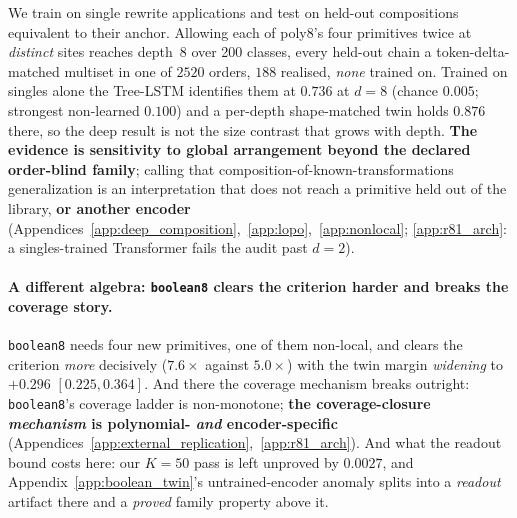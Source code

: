We train on single rewrite applications and test on held-out compositions equivalent to their anchor. Allowing each of poly8's four primitives twice at \emph{distinct} sites reaches depth~8 over 200 classes, every held-out chain a token-delta-matched multiset in one of $2520$ orders, $188$ realised, \emph{none} trained on. Trained on singles alone the Tree-LSTM identifies them at $\mathbf{0.736}$ at $d{=}8$ (chance $0.005$; strongest non-learned $0.100$) and a per-depth shape-matched twin holds $\mathbf{0.876}$ there, so the deep result is not the size contrast that grows with depth. \textbf{The evidence is sensitivity to global arrangement beyond the declared order-blind family}; calling that composition-of-known-transformations generalization is an interpretation that does not reach a primitive held out of the library, \textbf{or another encoder} (Appendices~\ref{app:deep_composition},~\ref{app:lopo},~\ref{app:nonlocal}; \ref{app:r81_arch}: a singles-trained Transformer fails the audit past $d{=}2$).

\paragraph{A different algebra: \texttt{boolean8} clears the criterion harder and breaks the coverage story.} \texttt{boolean8} needs four new primitives, one of them non-local, and clears the criterion \emph{more} decisively ($7.6\times$ against $5.0\times$) with the twin margin \emph{widening} to $+0.296$ $[0.225,0.364]$. And there the coverage mechanism breaks outright: \texttt{boolean8}'s coverage ladder is non-monotone; \textbf{the coverage-closure \emph{mechanism} is polynomial- \emph{and} encoder-specific} (Appendices~\ref{app:external_replication},~\ref{app:r81_arch}). And what the readout bound costs here: our $K{=}50$ pass is left unproved by $0.0027$, and Appendix~\ref{app:boolean_twin}'s untrained-encoder anomaly splits into a \emph{readout} artifact there and a \emph{proved} family property above it.


